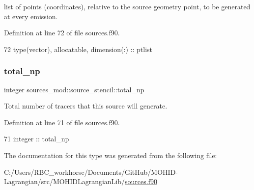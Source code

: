 list of points (coordinates), relative to the source geometry point, to be generated at every emission. 



Definition at line 72 of file sources.\+f90.


\begin{DoxyCode}
72         \textcolor{keywordtype}{type}(vector), \textcolor{keywordtype}{allocatable}, \textcolor{keywordtype}{dimension(:)} :: ptlist
\end{DoxyCode}
\mbox{\label{structsources__mod_1_1source__stencil_ad7373d51bdf50a4595b6c0fa69f7f915}} 
\subsubsection{\texorpdfstring{total\+\_\+np}{total\_np}}
{\footnotesize\ttfamily integer sources\+\_\+mod\+::source\+\_\+stencil\+::total\+\_\+np\hspace{0.3cm}{\ttfamily [private]}}



Total number of tracers that this source will generate. 



Definition at line 71 of file sources.\+f90.


\begin{DoxyCode}
71         \textcolor{keywordtype}{integer} :: total\_np
\end{DoxyCode}


The documentation for this type was generated from the following file\+:\begin{DoxyCompactItemize}
\item 
C\+:/\+Users/\+R\+B\+C\+\_\+workhorse/\+Documents/\+Git\+Hub/\+M\+O\+H\+I\+D-\/\+Lagrangian/src/\+M\+O\+H\+I\+D\+Lagrangian\+Lib/\mbox{\hyperlink{sources_8f90}{sources.\+f90}}\end{DoxyCompactItemize}
